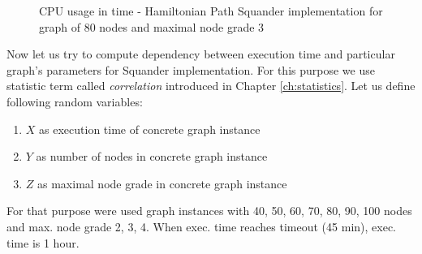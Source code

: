 \documentclass[11pt,twoside,a4paper]{book}
\begin{document}
\begin{figure}[ht]
\begin{center}

\caption{CPU usage in time - Hamiltonian Path Squander implementation for graph
of 80 nodes and maximal node grade 3}
\label{fig:hpSCpu803}
\end{center}
\end{figure}
\clearpage 

Now let us try to compute dependency between execution time and particular
graph's parameters for Squander implementation. For this purpose we use
statistic term called \textit{correlation} introduced in Chapter
\ref{ch:statistics}. Let us define following random variables:

\begin{enumerate}
  \item $X$ as execution time of concrete graph instance
  \item $Y$ as number of nodes in concrete graph instance
  \item $Z$ as maximal node grade in concrete graph instance
\end{enumerate}


For that purpose were used graph instances with 40, 50, 60, 70, 80, 90, 100
nodes and max. node grade 2, 3, 4. When exec. time reaches timeout (45
min), exec. time is 1 hour.





\end{document}

